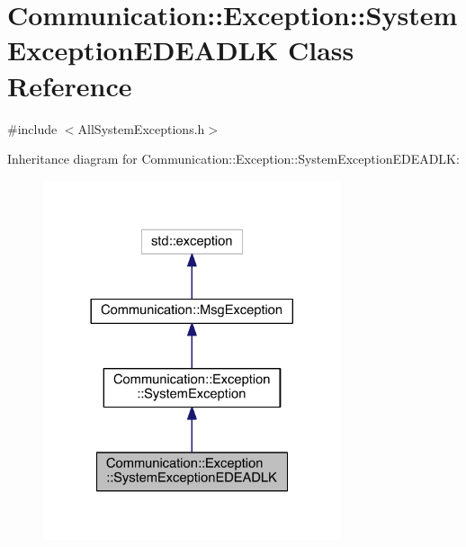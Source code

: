 \hypertarget{class_communication_1_1_exception_1_1_system_exception_e_d_e_a_d_l_k}{}\section{Communication\+:\+:Exception\+:\+:System\+Exception\+E\+D\+E\+A\+D\+L\+K Class Reference}
\label{class_communication_1_1_exception_1_1_system_exception_e_d_e_a_d_l_k}


{\ttfamily \#include $<$All\+System\+Exceptions.\+h$>$}



Inheritance diagram for Communication\+:\+:Exception\+:\+:System\+Exception\+E\+D\+E\+A\+D\+L\+K\+:\nopagebreak
\begin{figure}[H]
\begin{center}
\leavevmode
\includegraphics[width=248pt]{class_communication_1_1_exception_1_1_system_exception_e_d_e_a_d_l_k__inherit__graph}
\end{center}
\end{figure}


